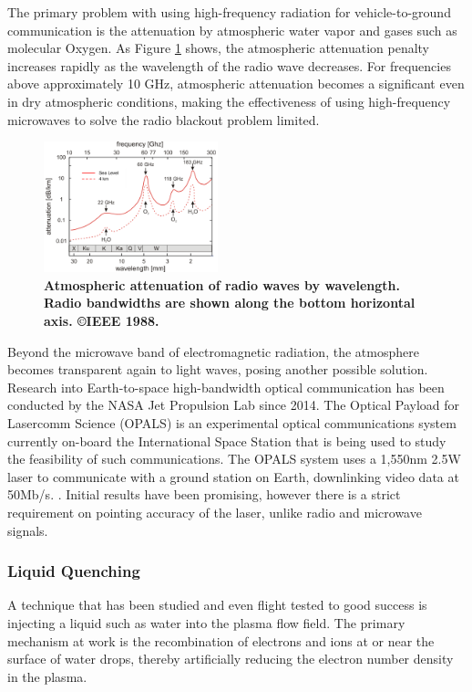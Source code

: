 \documentclass[twocolumn]{article}
\begin{document}
			The primary problem with using high-frequency radiation for vehicle-to-ground communication is the attenuation by atmospheric water vapor and gases such as molecular Oxygen.
			As Figure \ref{fig:RadioAttenuation} shows, the atmospheric attenuation penalty increases rapidly as the wavelength of the radio wave decreases.
			For frequencies above approximately 10 GHz, atmospheric attenuation becomes a significant even in dry atmospheric conditions, making the effectiveness of using high-frequency microwaves to solve the radio blackout problem limited.\cite{hartunian_implications_2007}
		
			\begin{figure}[H]
				\centering
				\includegraphics[width=0.45\textwidth]{Images/intro-atmospheric.png}
			\caption{\textbf{Atmospheric attenuation of radio waves by wavelength. Radio bandwidths are shown along the bottom horizontal axis.\cite{altshuler_comparison_1988} \copyright IEEE 1988.}}
			\label{fig:RadioAttenuation}
			\end{figure}
		
			Beyond the microwave band of electromagnetic radiation, the atmosphere becomes transparent again to light waves, posing another possible solution.
			Research into Earth-to-space high-bandwidth optical communication has been conducted by the NASA Jet Propulsion Lab since 2014.
			The Optical Payload for Lasercomm Science (OPALS) is an experimental optical communications system currently on-board the International Space Station that is being used to study the feasibility of such communications.
			The OPALS system uses a 1,550nm 2.5W laser to communicate with a ground station on Earth, downlinking video data at 50Mb/s. \cite{oaida_optical_2014}.
			Initial results have been promising, however there is a strict requirement on pointing accuracy of the laser, unlike radio and microwave signals. \cite{abrahamson_achieving_2015}
		
		\subsubsection*{Liquid Quenching}
			A technique that has been studied and even flight tested to good success is injecting a liquid such as water into the plasma flow field.
			The primary mechanism at work is the recombination of electrons and ions at or near the surface of water drops, thereby artificially reducing the electron number density in the plasma.\cite{evans_reduction_1965}
			
\end{document}
